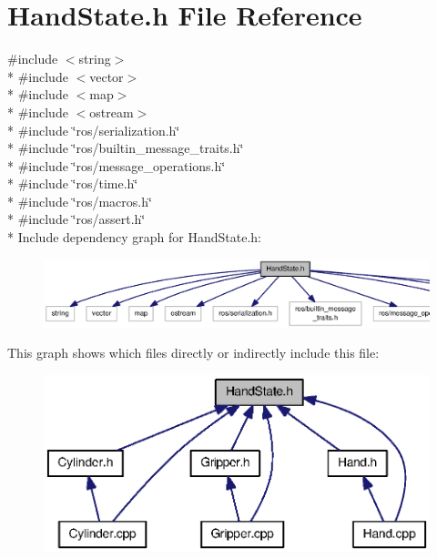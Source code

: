 \section{Hand\-State.\-h File Reference}
\label{HandState_8h}
{\ttfamily \#include $<$string$>$}\\*
{\ttfamily \#include $<$vector$>$}\\*
{\ttfamily \#include $<$map$>$}\\*
{\ttfamily \#include $<$ostream$>$}\\*
{\ttfamily \#include \char`\"{}ros/serialization.\-h\char`\"{}}\\*
{\ttfamily \#include \char`\"{}ros/builtin\-\_\-message\-\_\-traits.\-h\char`\"{}}\\*
{\ttfamily \#include \char`\"{}ros/message\-\_\-operations.\-h\char`\"{}}\\*
{\ttfamily \#include \char`\"{}ros/time.\-h\char`\"{}}\\*
{\ttfamily \#include \char`\"{}ros/macros.\-h\char`\"{}}\\*
{\ttfamily \#include \char`\"{}ros/assert.\-h\char`\"{}}\\*
Include dependency graph for Hand\-State.\-h\-:
\nopagebreak
\begin{figure}[H]
\begin{center}
\leavevmode
\includegraphics[width=350pt]{HandState_8h__incl}
\end{center}
\end{figure}
This graph shows which files directly or indirectly include this file\-:
\nopagebreak
\begin{figure}[H]
\begin{center}
\leavevmode
\includegraphics[width=350pt]{HandState_8h__dep__incl}
\end{center}
\end{figure}
